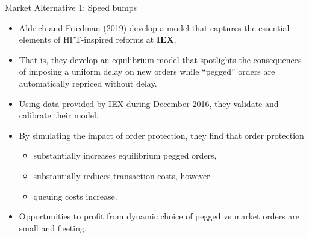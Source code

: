 \documentclass{beamer}
\begin{document}
\begin{frame}{Market Alternative 1: Speed bumps}

\begin{itemize}
    \item Aldrich and Friedman (2019) develop a model that captures the essential elements of HFT-inspired reforms at \textbf{IEX}.
    \item That is, they develop an equilibrium model that spotlights the consequences of imposing a uniform delay on new orders while “pegged” orders are automatically repriced without delay.
    \item Using data provided by IEX during December 2016, they validate and calibrate their model.
    \item By simulating the impact of order protection, they find that order protection
    \begin{itemize}
        \item substantially increases equilibrium pegged orders,
        \item substantially reduces transaction costs, however
        \item queuing costs increase.
    \end{itemize}
    \item Opportunities to profit from dynamic choice of pegged vs market orders are small and fleeting.
\end{itemize}

\end{frame}
\end{document}
